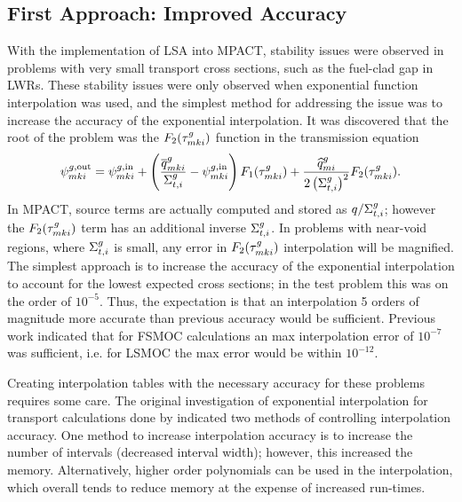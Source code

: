 {{    \subsection{First Approach: Improved Accuracy}{\label{ssec:LSMOC:ET:First Approach: Improved Accuracy}
      With the implementation of \ac{LSA} into MPACT, stability issues were observed in problems with very small transport cross sections, such as the fuel-clad gap in \acp{LWR}.
      These stability issues were only observed when exponential function interpolation was used, and the simplest method for addressing the issue was to increase the accuracy of the exponential interpolation.
      It was discovered that the root of the problem was the $F_2(\segopt)$ function in the transmission equation
      \begin{equation}\label{eq:LSMOC:ET:Transmission Original}
        \afluxout = \afluxin
                  + \left(\frac{\tsrcF}{\xst}-\afluxin\right)F_1(\segopt)
                  + \frac{\tsrcL}{2\left(\xst\right)^2}F_2(\segopt).
      \end{equation}
      In MPACT, source terms are actually computed and stored as $q/\xst$; however the $F_2(\segopt)$ term has an additional inverse $\xst$.
      In problems with near-void regions, where $\xst$ is small, any error in $F_2(\segopt)$ interpolation will be magnified.
      The simplest approach is to increase the accuracy of the exponential interpolation to account for the lowest expected cross sections; in the test problem this was on the order of $10^{-5}$.
      Thus, the expectation is that an interpolation 5 orders of magnitude more accurate than previous accuracy would be sufficient.
      Previous work \cite{Yamamoto2004} indicated that for \ac{FSMOC} calculations an max interpolation error of $10^{-7}$ was sufficient, i.e. for \ac{LSMOC} the max error would be within $10^{-12}$.

      Creating interpolation tables with the necessary accuracy for these problems requires some care.
      The original investigation of exponential interpolation for transport calculations  done by \citet{Yamamoto2004} indicated two methods of controlling interpolation accuracy.
      One method to increase interpolation accuracy is to increase the number of intervals (decreased interval width); however, this increased the memory.
      Alternatively, higher order polynomials can be used in the interpolation, which overall tends to reduce memory at the expense of increased run-times.



}}}
